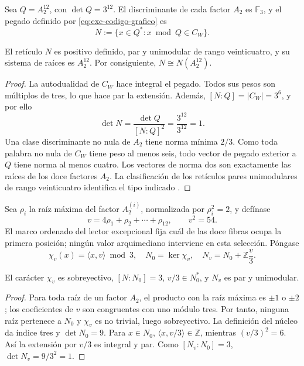 Sea \(Q=A_2^{12}\), con \(\det Q=3^{12}\). El discriminante de cada
factor \(A_2\) es \(\mathbb F_3\), y el pegado definido por
\eqref{eq:exc-codigo-grafico} es
\begin{equation}
 N:=\{x\in Q^*:x\bmod Q\in C_W\}.
 \label{eq:exc-niemeier-pegado}
\end{equation}

\begin{theorem}
\label{thm:exc-niemeier}
El retículo \(N\) es positivo definido, par y unimodular de rango
veinticuatro, y su sistema de raíces es \(A_2^{12}\). Por consiguiente,
\(N\cong N(A_2^{12})\).
\end{theorem}

\begin{proof}
La autodualidad de \(C_W\) hace integral el pegado. Todos sus pesos son
múltiplos de tres, lo que hace par la extensión. Además,
\([N:Q]=|C_W|=3^6\), y por ello
\[
 \det N=\frac{\det Q}{[N:Q]^2}
 =\frac{3^{12}}{3^{12}}=1.
\]
Una clase discriminante no nula de \(A_2\) tiene norma mínima \(2/3\).
Como toda palabra no nula de \(C_W\) tiene peso al menos seis, todo vector
de pegado exterior a \(Q\) tiene norma al menos cuatro. Los vectores de
norma dos son exactamente las raíces de los doce factores \(A_2\). La
clasificación de los retículos pares unimodulares de rango veinticuatro
identifica el tipo indicado \citep{ConwaySloane1999}.
\end{proof}

Sea \(\rho_i\) la raíz máxima del factor \(A_2^{(i)}\), normalizada por
\(\rho_i^2=2\), y defínase
\begin{equation}
 v=4\rho_1+\rho_2+\cdots+\rho_{12},
 \qquad v^2=54.
 \label{eq:exc-vector-vecino}
\end{equation}
El marco ordenado del lector excepcional fija cuál de las doce fibras ocupa
la primera posición; ningún valor arquimediano interviene en esta selección.
Póngase
\begin{equation}
 \chi_v(x)=\langle x,v\rangle\bmod3,
 \quad N_0=\ker\chi_v,
 \quad N_v=N_0+\mathbb Z\frac v3.
 \label{eq:exc-vecino-indice-tres}
\end{equation}

\begin{lemma}
\label{lem:exc-estructura-vecino}
El carácter \(\chi_v\) es sobreyectivo, \([N:N_0]=3\),
\(v/3\in N_0^*\), y \(N_v\) es par y unimodular.
\end{lemma}

\begin{proof}
Para toda raíz de un factor \(A_2\), el producto con la raíz máxima es
\(\pm1\) o \(\pm2\); los coeficientes de \(v\) son congruentes con uno
módulo tres. Por tanto, ninguna raíz pertenece a \(N_0\) y \(\chi_v\) es
no trivial, luego sobreyectivo. La definición del núcleo da índice tres y
\(\det N_0=9\). Para \(x\in N_0\),
\(\langle x,v/3\rangle\in\mathbb Z\), mientras
\((v/3)^2=6\). Así la extensión por \(v/3\) es integral y par. Como
\([N_v:N_0]=3\),
\(\det N_v=9/3^2=1\).
\end{proof}

